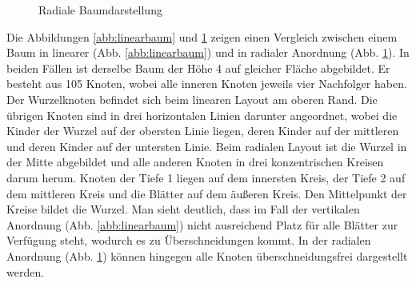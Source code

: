 \begin{figure}
\begin{minipage}{.5\textwidth}
		\caption{Radiale Baumdarstellung}
		\label{abb:radialbaum}
	\end{minipage}
\end{figure}
Die Abbildungen \ref{abb:linearbaum} und \ref{abb:radialbaum} zeigen einen Vergleich zwischen einem Baum in linearer (Abb. \ref{abb:linearbaum}) und in radialer Anordnung (Abb. \ref{abb:radialbaum}). In beiden Fällen ist derselbe Baum der Höhe 4 auf gleicher Fläche abgebildet. Er besteht aus 105 Knoten, wobei alle inneren Knoten jeweils vier Nachfolger haben. Der Wurzelknoten befindet sich beim linearen Layout am oberen Rand. Die übrigen Knoten sind in drei horizontalen Linien darunter angeordnet, wobei die Kinder der Wurzel auf der obersten Linie liegen, deren Kinder auf der mittleren und deren Kinder auf der untersten Linie. Beim radialen Layout ist die Wurzel in der Mitte abgebildet und alle anderen Knoten in drei konzentrischen Kreisen darum herum. Knoten der Tiefe 1 liegen auf dem innersten Kreis, der Tiefe 2 auf dem mittleren Kreis und die Blätter auf dem äußeren Kreis. Den Mittelpunkt der Kreise bildet die Wurzel. Man sieht deutlich, dass im Fall der vertikalen Anordnung (Abb. \ref{abb:linearbaum}) nicht ausreichend Platz für alle Blätter zur Verfügung steht, wodurch es zu Überschneidungen kommt. In der radialen Anordnung (Abb. \ref{abb:radialbaum}) können hingegen alle Knoten überschneidungsfrei dargestellt werden.

